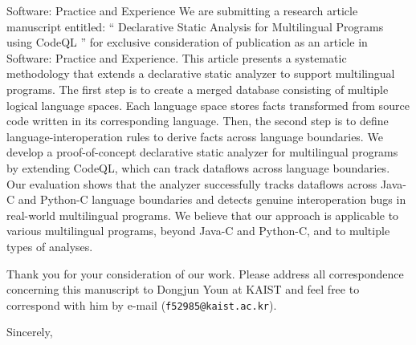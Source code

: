 \documentclass{letter}
\begin{document}
\begin{letter}{
Software: Practice and Experience
}
We are submitting a research article manuscript entitled: ``
Declarative Static Analysis for Multilingual Programs using CodeQL
'' for exclusive consideration of publication as an
article in Software: Practice and Experience.
This article presents a systematic methodology that extends a declarative static
analyzer to support multilingual programs.  The first step is to create a
merged database consisting of multiple logical language spaces. Each language
space stores facts transformed from source code written in its corresponding
language.  Then, the second step is to define language-interoperation rules to
derive facts across language boundaries.  We develop a proof-of-concept
declarative static analyzer for multilingual programs by extending CodeQL,
which can track dataflows across language boundaries. Our evaluation shows that
the analyzer successfully tracks dataflows across Java-C and Python-C language
boundaries and detects genuine interoperation bugs in real-world multilingual
programs.  We believe that our approach is applicable to various multilingual
programs, beyond Java-C and Python-C, and to multiple types of analyses.

\medskip

Thank you for your consideration of our work.
Please address all correspondence concerning this manuscript to Dongjun Youn at KAIST and
feel free to correspond with him by e-mail ({\tt f52985@kaist.ac.kr}).

\closing{Sincerely,}
\end{letter}
\end{document}
